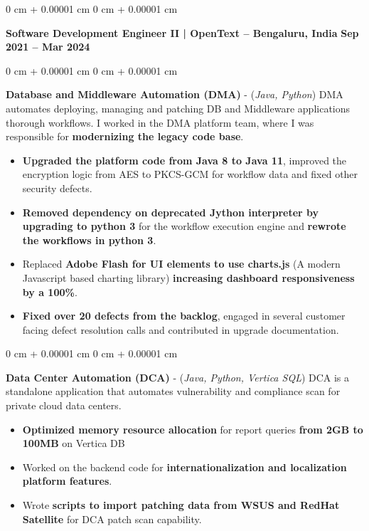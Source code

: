 \documentclass[10pt, letterpaper]{article}
\newenvironment{highlights}{
    \begin{itemize}[
        topsep=0.10 cm,
        parsep=0.10 cm,
        partopsep=0pt,
        itemsep=0pt,
        leftmargin=0 cm + 10pt
    ]
}{
    \end{itemize}
} %
\newenvironment{onecolentry}{
    \begin{adjustwidth}{
        0 cm + 0.00001 cm
    }{
        0 cm + 0.00001 cm
    }
}{
    \end{adjustwidth}
} %
\newenvironment{twocolentry}[2][]{
    \onecolentry
    \def\secondColumn{#2}
    \setcolumnwidth{\fill, 4.5 cm}
    \begin{paracol}{2}
}{
    \switchcolumn \raggedleft \secondColumn
    \end{paracol}
    \endonecolentry
} %
\begin{document}
        \begin{twocolentry}{
            \textbf{Sep 2021 – Mar 2024}
        }
            {\textbf{{\color{MidnightBlue}Software Development Engineer II} |  OpenText -- Bengaluru, India}}\end{twocolentry}
        \vspace{0.20 cm}
        \begin{onecolentry}
            \textbf{Database and Middleware Automation (DMA)} - (\textit{Java, Python})
            \vspace{0.10 cm}
            \newline DMA automates deploying, managing and patching DB and Middleware applications thorough workflows. I worked in the DMA platform team, where I was responsible for \textbf{modernizing the legacy code base}.
            \begin{highlights}
                \item \textbf{Upgraded the platform code from Java 8 to Java 11}, improved the encryption logic from AES to PKCS-GCM for workflow data and fixed other security defects.
                \item \textbf{Removed dependency on deprecated Jython interpreter by upgrading to python 3} for the workflow execution engine and \textbf{rewrote the workflows in python 3}.
                \item Replaced \textbf{Adobe Flash for UI elements to use charts.js} (A modern Javascript based charting library) \textbf{increasing dashboard responsiveness by a 100\%}.
                \item \textbf{Fixed over 20 defects from the backlog}, engaged in several customer facing defect resolution calls and contributed in upgrade documentation.
            \end{highlights}
        \end{onecolentry}

         \vspace{0.20 cm}
        \begin{onecolentry}
            \textbf{Data Center Automation (DCA)} - (\textit{Java, Python, Vertica SQL})
            \vspace{0.10 cm}
            \newline DCA is a standalone application that automates vulnerability and compliance scan for private cloud data centers.
            \begin{highlights}
                \item \textbf{Optimized memory resource allocation} for report queries \textbf{from 2GB to 100MB} on Vertica DB
                \item Worked on the backend code for \textbf{internationalization and localization platform features}.
                \item Wrote \textbf{scripts to import patching data from WSUS and RedHat Satellite} for DCA patch scan capability.
            \end{highlights}
        \end{onecolentry}
\end{document}
